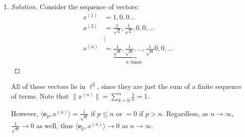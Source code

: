 \documentclass{article}
\begin{document}
\begin{enumerate}
\begin{proof}[Solution]
		converge,
		so our limit laws tell us that their sum must also converge,
		and $R_k$ is just the square of a convergent sequence,
		and so $R_k$ must also converge.
		Additionally, in order for $x,y \in \ell^2$,
		we must have that $L_k$ converges.
		Thus, both of their $\limsup$s and $\liminf$s
		must equal each other, so we get
		\[
			\lim_{k\to\infty} L_k \leq \lim_{k\to\infty} R_k
		\]
		But extracting the definitions of $L_k$ and $R_k$,
		this is just
		\[
			\lim_{k\to\infty}\sqrt{\sum_{n=1}^k x_n + y_n} \leq
			\lim_{k\to\infty}\sqrt{\sum_{n=1}^k x^2_n} +
			\lim_{k\to\infty}\sqrt{\sum_{n=1}^k y^2_n}
		\]
		\[
			\implies \lVert x + y\rVert = \sqrt{\sum_{n=1}^\infty x_n + y_n}
			\leq \sqrt{\sum_{n=1}^\infty x^2_n} + \sqrt{\sum_{n=1}^\infty y^2_n}
			= \lVert x \rVert + \lVert y \rVert
		\]
	\end{proof}
	\item \begin{proof}[Solution]\let\qed\relax
		Consider the sequence of vectors:
		\begin{align*}
			x^{(1)} &= 1,0,0\dots\\
			x^{(2)} &= \frac{1}{\sqrt{2}}, \frac{1}{\sqrt{2}},0,0,\dots\\
					&\vdots\\
			x^{(n)} &= \underbrace{\frac{1}{\sqrt{n}}, \frac{1}{\sqrt{n}},
			\dots, \frac{1}{\sqrt{n}}}_{n \text{ times}}
			0,0,\dots
		\end{align*}
	\end{proof}
	All of these vectors lie in $\ell^2$,
	since they are just the sum of a finite sequence of terms.
	Note that $\lVert x^{(n)}\rVert = \sum_{k=0}^n \frac{1}{n} = 1$.

	However, $\langle \mathbf{e}_p, x^{(n)} \rangle = \frac{1}{\sqrt{n}}$
	if $p \leq n$ or $= 0$ if $p > n$.
	Regardless,
	as $n \to \infty$,
	$\frac{1}{\sqrt{n}} \to 0$ as well,
	thus $\langle \mathbf{e}_p, x^{(n)} \rangle \to 0$ as $n \to \infty$.
\end{enumerate}
\clearpage
\end{document}
